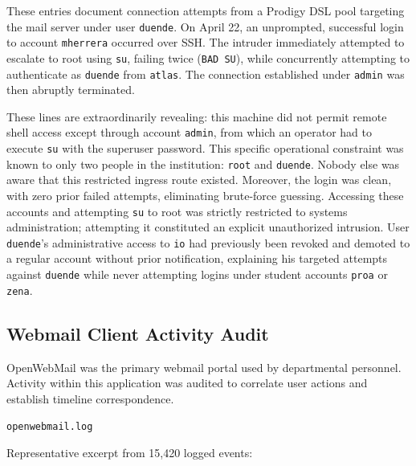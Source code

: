 \vspace{1em}

These entries document connection attempts from a Prodigy DSL pool targeting the mail server under user \texttt{duende}. On April 22, an unprompted, successful login to account \texttt{mherrera} occurred over SSH. The intruder immediately attempted to escalate to root using \texttt{su}, failing twice (\texttt{BAD SU}), while concurrently attempting to authenticate as \texttt{duende} from \texttt{atlas}. The connection established under \texttt{admin} was then abruptly terminated.

These lines are extraordinarily revealing: this machine did not permit remote shell access except through account \texttt{admin}, from which an operator had to execute \texttt{su} with the superuser password. This specific operational constraint was known to only two people in the institution: \texttt{root} and \texttt{duende}. Nobody else was aware that this restricted ingress route existed. Moreover, the login was clean, with zero prior failed attempts, eliminating brute-force guessing. Accessing these accounts and attempting \texttt{su} to root was strictly restricted to systems administration; attempting it constituted an explicit unauthorized intrusion. User \texttt{duende}'s administrative access to \texttt{io} had previously been revoked and demoted to a regular account without prior notification, explaining his targeted attempts against \texttt{duende} while never attempting logins under student accounts \texttt{proa} or \texttt{zena}.

\subsection{Webmail Client Activity Audit}

OpenWebMail was the primary webmail portal used by departmental personnel. Activity within this application was audited to correlate user actions and establish timeline correspondence.

\texttt{openwebmail.log}

Representative excerpt from 15,420 logged events:
 \vspace{1em}

